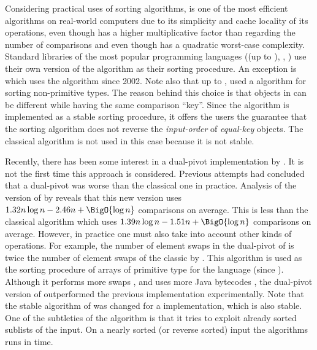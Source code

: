 Considering practical uses of sorting algorithms, \quicksort is one of the most
efficient algorithms on real-world computers due to its simplicity and cache
locality of its operations, even though \quicksort has a higher
multiplicative factor than \mergesort regarding the number of
comparisons and even though \quicksort has a quadratic worst-case complexity. Standard libraries of the most
popular programming languages (\Java (up to ), \CC, \CXX) use their own
version of the \quicksort algorithm as their sorting procedure. An exception is
\Python which uses the \timsort algorithm since 2002. Note also that up to , \Java used a \mergesort algorithm for sorting non-primitive types. The
reason behind this choice is that objects in \Java can be different while
having the same comparison ``key''. Since the \Java \mergesort algorithm is
implemented as a stable sorting procedure, it offers the users the guarantee
that the sorting algorithm does not reverse the \emph{input-order} of
\emph{equal-key} objects.
The classical \quicksort algorithm is not used in this case because it is not
stable.

Recently, there has been some interest in a dual-pivot \quicksort
implementation by \citet*{yaroslavskiy:2009}. It is not the first time this
approach is considered. Previous attempts \cite{sedgewick:1980} had concluded
that a dual-pivot \quicksort was worse than the classical one in practice.
Analysis of the version of \citet*{yaroslavskiy:2009} by \citet*{wild:2012}
reveals that this new version uses \(1.32n \log n - 2.46n + \BigO{\log n}\)
comparisons on average. This is less than the classical \quicksort algorithm which uses
\(1.39n \log n - 1.51n + \BigO{\log n}\) comparisons on average. However, in practice one must also take into account
other kinds of operations. For example, the number of element swaps in the
dual-pivot \quicksort of \citeauthor{yaroslavskiy:2009} is twice the number of
element swaps of the classic \quicksort by \citeauthor{hoare:1962}. This
algorithm is used as the sorting procedure of arrays of primitive type for
the \Java language (since ). Although it performs more
swaps \cite{wild:2012}, and uses more Java bytecodes \cite{wild:2013}, the
dual-pivot version of \citet*{yaroslavskiy:2009} outperformed the previous
\quicksort implementation experimentally. Note that the stable \mergesort
algorithm of  was changed for a \timsort implementation, which is
also stable. One of the subtleties of the \timsort algorithm is that it tries
to exploit already sorted sublists of the input. On a nearly sorted (or
reverse sorted) input the \timsort algorithms runs in  time.

